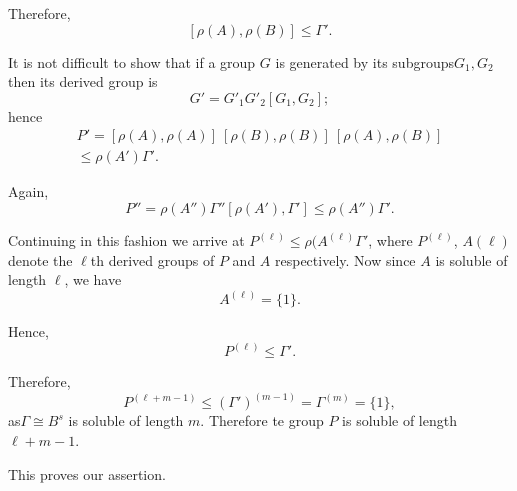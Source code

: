 Therefore,
$$
[\rho (A), \rho (B)] \le \Gamma'. 
$$

It is not difficult to show that if a group $G$ is generated by its
subgroups\pageoriginale $G_1, G_2$ then its derived group is  
$$
G'= G'_1 G'_2 [G_1, G_2];
$$
hence   
\begin{gather*}
  P' =[\rho (A), \rho (A)]~ [\rho (B), \rho (B)]~ [\rho (A), \rho (B)] \\ 
    \le \rho (A') \Gamma'.  
\end{gather*}

Again,
$$
P'' = \rho (A'') \Gamma '' [\rho (A'), \Gamma '] \le \rho (A '') \Gamma '. 
$$

Continuing in this fashion we arrive at  $P^{(\ell)} \leq \rho
(A^{(\ell)}{\Gamma'}$, 
where $P^{(\ell)}$, $A(\ell)$ denote the $\ell$th derived groups of
$P$ and $A$ respectively. Now  since $A$ is soluble of length  $\ell$,
we have  
$$
A^{(\ell)}= \{ 1\}.
$$

Hence,
$$
P^{(\ell)} \le \Gamma '. 
$$

Therefore,
$$
P^{(\ell + m-1)} \le  (\Gamma ')^{(m-1)} = \Gamma^{(m)} = \{ 1 \},
$$
as\pageoriginale $\Gamma \cong B^s$ is soluble of length $m$.  Therefore te group
$P$ is soluble of length $\ell + m-1$. 

This proves our assertion.
